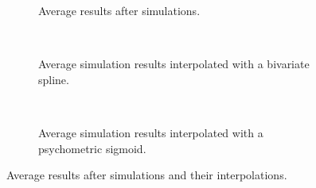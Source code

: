 \newpage

\begin{multicols}{2}

\begin{figure}[H]
     \centering
    \begin{subfigure}[t]{0.41\textwidth}
        \centering
        
        \vspace{-\baselineskip}
        \caption{Average results after simulations.}
        \label{fig:sim-res}
    \end{subfigure}
    \\ \vspace{\baselineskip}
    \begin{subfigure}[t]{0.41\textwidth}
        \centering
        
        \vspace{-\baselineskip}
        \caption{Average simulation results interpolated with a bivariate spline.}
        \label{fig:sim-res-spline}
    \end{subfigure}
    \\ \vspace{\baselineskip}
    \begin{subfigure}[t]{0.41\textwidth}
        \centering
        
        \vspace{-\baselineskip}
        \caption{Average simulation results interpolated with a psychometric sigmoid.}
        \label{fig:sim-res-sigmoid}
    \end{subfigure}
    \caption[Simulation results]{Average results after simulations and their interpolations.}
    \label{fig:all-sim-res}
\end{figure}

\columnbreak


\end{multicols}
